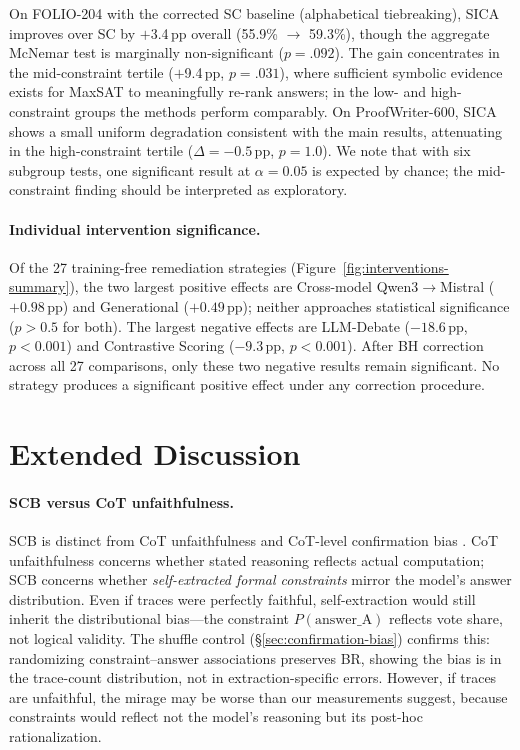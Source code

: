 On FOLIO-204 with the corrected SC baseline (alphabetical tiebreaking), SICA improves over SC by $+$3.4\,pp overall (55.9\% $\to$ 59.3\%), though the aggregate McNemar test is marginally non-significant ($p{=}.092$).
The gain concentrates in the mid-constraint tertile ($+$9.4\,pp, $p{=}.031$), where sufficient symbolic evidence exists for MaxSAT to meaningfully re-rank answers; in the low- and high-constraint groups the methods perform comparably.
On ProofWriter-600, SICA shows a small uniform degradation consistent with the main results, attenuating in the high-constraint tertile ($\Delta{=}{-}0.5$\,pp, $p{=}1.0$).
We note that with six subgroup tests, one significant result at $\alpha{=}0.05$ is expected by chance; the mid-constraint finding should be interpreted as exploratory.

\paragraph{Individual intervention significance.}
\label{app:intervention-individual}
Of the 27 training-free remediation strategies (Figure~\ref{fig:interventions-summary}), the two largest positive effects are Cross-model Qwen3$\to$Mistral ($+0.98$\,pp) and Generational ($+0.49$\,pp); neither approaches statistical significance ($p > 0.5$ for both). The largest negative effects are LLM-Debate ($-18.6$\,pp, $p < 0.001$) and Contrastive Scoring ($-9.3$\,pp, $p < 0.001$). After BH correction across all 27 comparisons, only these two negative results remain significant. No strategy produces a significant positive effect under any correction procedure.

\section{Extended Discussion}
\label{app:extended-discussion}
\label{app:limitations-extended}

\paragraph{SCB versus CoT unfaithfulness.}
SCB is distinct from CoT unfaithfulness \citep{turpin2023language} and CoT-level confirmation bias \citep{wan2025unveiling, jhaveri2026failing}. CoT unfaithfulness concerns whether stated reasoning reflects actual computation; SCB concerns whether \emph{self-extracted formal constraints} mirror the model's answer distribution. Even if traces were perfectly faithful, self-extraction would still inherit the distributional bias---the constraint $P(\text{answer\_A})$ reflects vote share, not logical validity. The shuffle control (\S\ref{sec:confirmation-bias}) confirms this: randomizing constraint--answer associations preserves BR, showing the bias is in the trace-count distribution, not in extraction-specific errors. However, if traces are unfaithful, the mirage may be worse than our measurements suggest, because constraints would reflect not the model's reasoning but its post-hoc rationalization.

